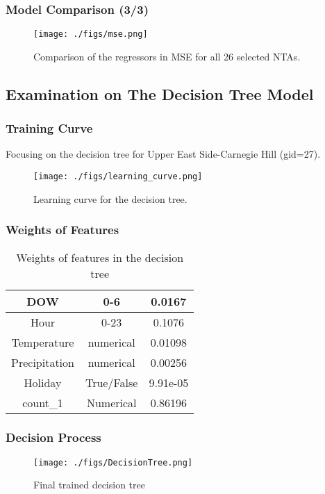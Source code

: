 \documentclass{beamer}
\begin{document}
\begin{frame}
  \frametitle{Model Comparison (3/3)}
  \begin{figure}[!t] 
    \center
    \texttt{[image: ./figs/mse.png]}
    \caption{Comparison of the regressors in MSE for all 26
    selected NTAs.}
    \label{fig:comparison_mse}
  \end{figure}
\end{frame}

\subsection[Decision Tree]{Examination on The Decision Tree Model}

\begin{frame}
  \frametitle{Training Curve}
  Focusing on the decision tree for Upper East Side-Carnegie Hill (gid=27).
  \begin{figure}[H] 
    \center
    \texttt{[image: ./figs/learning\_curve.png]}
    \caption{Learning curve for the decision tree.}
    \label{fig:learning_curve}
  \end{figure}
\end{frame}

\begin{frame}
  \frametitle{Weights of Features}
  \begin{table}[H]
    \renewcommand{\arraystretch}{1.3}
    \caption{Weights of features in the decision tree} 
    \label{table:feature}
    \centering
    \begin{tabular}{ | c | c | c |}
      \hline      
      DOW & 0-6 & 0.0167 \\
      \hline
      Hour  & 0-23 & 0.1076  \\
      \hline
      Temperature & numerical & 0.01098 \\
      \hline  
      Precipitation &numerical & 0.00256\\
      \hline
      Holiday & True/False & 9.91e-05\\
      \hline
      count\_1 & Numerical & 0.86196\\
      \hline
    \end{tabular}
  \end{table}
\end{frame}

\begin{frame}
  \frametitle{Decision Process}
  \begin{figure}[H] 
    \centering
    \texttt{[image: ./figs/DecisionTree.png]}
    \caption{Final trained decision tree}
    \label{fig:decision_process}
  \end{figure}
\end{frame}
\end{document}
